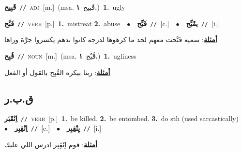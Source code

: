 \documentclass[10pt,a4paper,twoside]{article} %
\begin{document}
\begin{multicols}{2}
{\setlength\topsep{0pt}\textbf{\foreignlanguage{arabic}{قَبِيح}}\ {\color{gray}\texttt{//}\color{black}}\ \textsc{adj}\ [m.]\ \color{gray}(msa. \foreignlanguage{arabic}{قَبيح}~\foreignlanguage{arabic}{\textbf{١.}})\color{black}\ \textbf{1.}~ugly\ } \vspace{2mm}

{\setlength\topsep{0pt}\textbf{\foreignlanguage{arabic}{قَبَّح}}\ {\color{gray}\texttt{//}\color{black}}\ \textsc{verb}\ [p.]\ \textbf{1.}~mistreat  \textbf{2.}~abuse\ \ $\bullet$\ \ \setlength\topsep{0pt}\textbf{\foreignlanguage{arabic}{قَبِّح}}\ {\color{gray}\texttt{//}\color{black}}\ [c.]\ \ $\bullet$\ \ \setlength\topsep{0pt}\textbf{\foreignlanguage{arabic}{يقَبِّح}}\ {\color{gray}\texttt{//}\color{black}}\ [i.]\  \begin{flushright}\color{gray}\foreignlanguage{arabic}{\textbf{\underline{\foreignlanguage{arabic}{أمثلة}}}: سمية قَبَّحت معهم لحد ما كرهوها لدرجة كانوا بدهم يكسروا جرَّة وراها}\end{flushright}\color{black}} \vspace{2mm}

{\setlength\topsep{0pt}\textbf{\foreignlanguage{arabic}{قُبِح}}\ {\color{gray}\texttt{//}\color{black}}\ \textsc{noun}\ [m.]\ \color{gray}(msa. \foreignlanguage{arabic}{قُبْح}~\foreignlanguage{arabic}{\textbf{١.}})\color{black}\ \textbf{1.}~ugliness\  \begin{flushright}\color{gray}\foreignlanguage{arabic}{\textbf{\underline{\foreignlanguage{arabic}{أمثلة}}}: ربنا بيكره القُبِح بالقول أو الفعل}\end{flushright}\color{black}} \vspace{2mm}

\vspace{-3mm}
\subsection*{\color{blue}\foreignlanguage{arabic}{ق.ب.ر}\color{blue}{}} 

{\setlength\topsep{0pt}\textbf{\foreignlanguage{arabic}{اِنْقَبَر}}\ {\color{gray}\texttt{//}\color{black}}\ \textsc{verb}\ [p.]\ \textbf{1.}~be killed.  \textbf{2.}~be entombed.  \textbf{3.}~do sth (used sarcastically)\ \ $\bullet$\ \ \setlength\topsep{0pt}\textbf{\foreignlanguage{arabic}{اِنْقِبِر}}\ {\color{gray}\texttt{//}\color{black}}\ [c.]\ \ $\bullet$\ \ \setlength\topsep{0pt}\textbf{\foreignlanguage{arabic}{يِنْقِبِر}}\ {\color{gray}\texttt{//}\color{black}}\ [i.]\  \begin{flushright}\color{gray}\foreignlanguage{arabic}{\textbf{\underline{\foreignlanguage{arabic}{أمثلة}}}: قوم اِنْقِبِر ادرس  اللي عليك}\end{flushright}\color{black}} \vspace{2mm}


\end{multicols}
\end{document}
